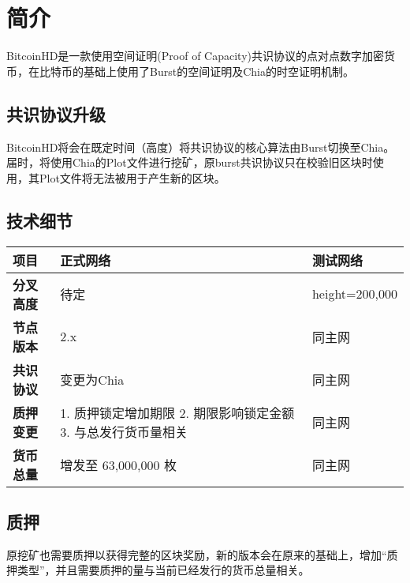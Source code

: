 \chapter{简介}
\begin{flushleft}
    BitcoinHD是一款使用空间证明(Proof of Capacity)共识协议的点对点数字加密货币，在比特币的基础上使用了Burst的空间证明及Chia的时空证明机制。
\end{flushleft}
\section{共识协议升级}
\begin{flushleft}
    BitcoinHD将会在既定时间（高度）将共识协议的核心算法由Burst切换至Chia。届时，将使用Chia的Plot文件进行挖矿，原burst共识协议只在校验旧区块时使用，其Plot文件将无法被用于产生新的区块。
\end{flushleft}
\section{技术细节}
\begin{tabular}{ |p{2cm}|p{7cm}|l| }
    \hline
    \rowcolor{lightgray} 项目 & 正式网络 & 测试网络 \\[5pt]
    \hline
    \rowcolor{lightgray!30} \textbf{分叉高度} & 待定 & height=200,000 \\[5pt]
    \textbf{节点版本} & 2.x & 同主网 \\[5pt]
    \rowcolor{lightgray!30} \textbf{共识协议} & 变更为Chia & 同主网 \\[5pt]
    \textbf{质押变更} & 1. 质押锁定增加期限 2. 期限影响锁定金额 3. 与总发行货币量相关 & 同主网 \\[5pt]
    \rowcolor{lightgray!30} \textbf{货币总量} & 增发至 63,000,000 枚 & 同主网 \\[5pt]
    \hline
\end{tabular}
\section{质押}
\begin{flushleft}
    原挖矿也需要质押以获得完整的区块奖励，新的版本会在原来的基础上，增加``质押类型''，并且需要质押的量与当前已经发行的货币总量相关。
\end{flushleft}
